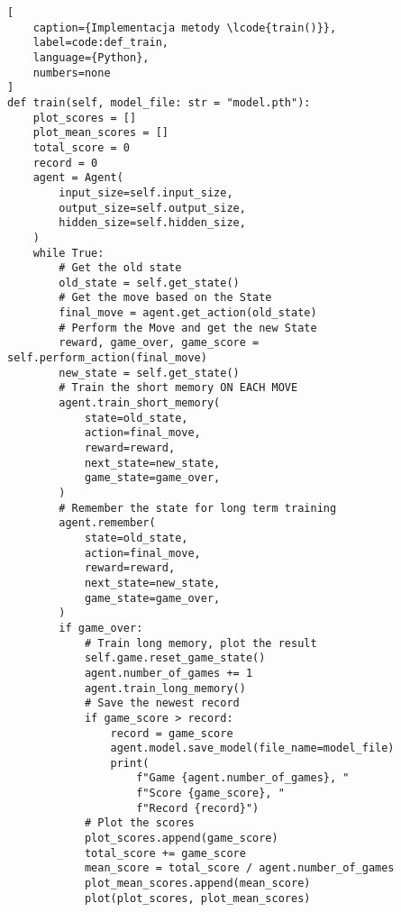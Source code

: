 \begin{onepage}
    \begin{lstlisting}[
    caption={Implementacja metody \lcode{train()}},
    label=code:def_train,
    language={Python},
    numbers=none
]
def train(self, model_file: str = "model.pth"):
    plot_scores = []
    plot_mean_scores = []
    total_score = 0
    record = 0
    agent = Agent(
        input_size=self.input_size,
        output_size=self.output_size,
        hidden_size=self.hidden_size,
    )
    while True:
        # Get the old state
        old_state = self.get_state()
        # Get the move based on the State
        final_move = agent.get_action(old_state)
        # Perform the Move and get the new State
        reward, game_over, game_score = self.perform_action(final_move)
        new_state = self.get_state()
        # Train the short memory ON EACH MOVE
        agent.train_short_memory(
            state=old_state,
            action=final_move,
            reward=reward,
            next_state=new_state,
            game_state=game_over,
        )
        # Remember the state for long term training
        agent.remember(
            state=old_state,
            action=final_move,
            reward=reward,
            next_state=new_state,
            game_state=game_over,
        )
        if game_over:
            # Train long memory, plot the result
            self.game.reset_game_state()
            agent.number_of_games += 1
            agent.train_long_memory()
            # Save the newest record
            if game_score > record:
                record = game_score
                agent.model.save_model(file_name=model_file)
                print(
                    f"Game {agent.number_of_games}, "
                    f"Score {game_score}, "
                    f"Record {record}")
            # Plot the scores
            plot_scores.append(game_score)
            total_score += game_score
            mean_score = total_score / agent.number_of_games
            plot_mean_scores.append(mean_score)
            plot(plot_scores, plot_mean_scores)
    \end{lstlisting}
\end{onepage}
